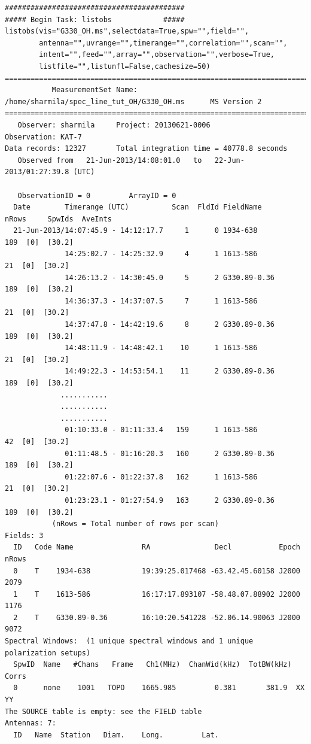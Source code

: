 \documentclass[force,almostfull,justified]{tufte-book}
\begin{document}
\begin{casaoutput}
\begin{verbatim}
##########################################
##### Begin Task: listobs            #####
listobs(vis="G330_OH.ms",selectdata=True,spw="",field="",
        antenna="",uvrange="",timerange="",correlation="",scan="",
        intent="",feed="",array="",observation="",verbose=True,
        listfile="",listunfl=False,cachesize=50)
================================================================================
           MeasurementSet Name:  /home/sharmila/spec_line_tut_OH/G330_OH.ms      MS Version 2
================================================================================
   Observer: sharmila     Project: 20130621-0006  
Observation: KAT-7
Data records: 12327       Total integration time = 40778.8 seconds
   Observed from   21-Jun-2013/14:08:01.0   to   22-Jun-2013/01:27:39.8 (UTC)
   
   ObservationID = 0         ArrayID = 0
  Date        Timerange (UTC)          Scan  FldId FieldName             nRows     SpwIds  AveInts
  21-Jun-2013/14:07:45.9 - 14:12:17.7     1      0 1934-638                   189  [0]  [30.2] 
              14:25:02.7 - 14:25:32.9     4      1 1613-586                    21  [0]  [30.2] 
              14:26:13.2 - 14:30:45.0     5      2 G330.89-0.36               189  [0]  [30.2] 
              14:36:37.3 - 14:37:07.5     7      1 1613-586                    21  [0]  [30.2] 
              14:37:47.8 - 14:42:19.6     8      2 G330.89-0.36               189  [0]  [30.2] 
              14:48:11.9 - 14:48:42.1    10      1 1613-586                    21  [0]  [30.2] 
              14:49:22.3 - 14:53:54.1    11      2 G330.89-0.36               189  [0]  [30.2] 
             ...........
             ...........
             ...........
              01:10:33.0 - 01:11:33.4   159      1 1613-586                    42  [0]  [30.2] 
              01:11:48.5 - 01:16:20.3   160      2 G330.89-0.36               189  [0]  [30.2] 
              01:22:07.6 - 01:22:37.8   162      1 1613-586                    21  [0]  [30.2] 
              01:23:23.1 - 01:27:54.9   163      2 G330.89-0.36               189  [0]  [30.2] 
           (nRows = Total number of rows per scan) 
Fields: 3
  ID   Code Name                RA               Decl           Epoch        nRows
  0    T    1934-638            19:39:25.017468 -63.42.45.60158 J2000         2079
  1    T    1613-586            16:17:17.893107 -58.48.07.88902 J2000         1176
  2    T    G330.89-0.36        16:10:20.541228 -52.06.14.90063 J2000         9072
Spectral Windows:  (1 unique spectral windows and 1 unique polarization setups)
  SpwID  Name   #Chans   Frame   Ch1(MHz)  ChanWid(kHz)  TotBW(kHz)  Corrs  
  0      none    1001   TOPO    1665.985         0.381       381.9  XX  YY
The SOURCE table is empty: see the FIELD table
Antennas: 7:
  ID   Name  Station   Diam.    Long.         Lat.                
                                                                               

\end{verbatim}
\end{casaoutput}
\end{document}
